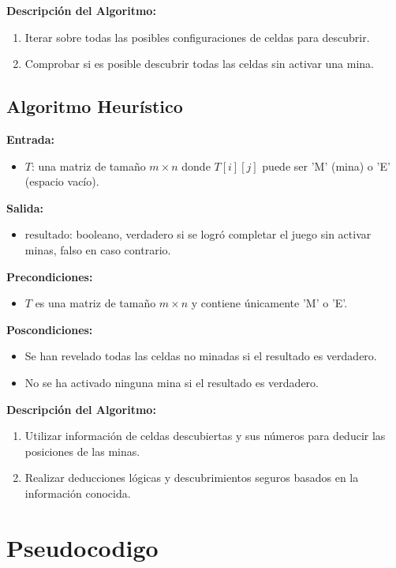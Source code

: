 \documentclass{article}
\begin{document}
\textbf{Descripción del Algoritmo:}
\begin{enumerate}
    \item Iterar sobre todas las posibles configuraciones de celdas para descubrir.
    \item Comprobar si es posible descubrir todas las celdas sin activar una mina.
\end{enumerate}

\subsection*{Algoritmo Heurístico}

\textbf{Entrada:}
\begin{itemize}
    \item \( T \): una matriz de tamaño \( m \times n \) donde \( T[i][j] \) puede ser 'M' (mina) o 'E' (espacio vacío).
\end{itemize}

\textbf{Salida:}
\begin{itemize}
    \item \( \text{resultado} \): booleano, verdadero si se logró completar el juego sin activar minas, falso en caso contrario.
\end{itemize}

\textbf{Precondiciones:}
\begin{itemize}
    \item \( T \) es una matriz de tamaño \( m \times n \) y contiene únicamente 'M' o 'E'.
\end{itemize}

\textbf{Poscondiciones:}
\begin{itemize}
    \item Se han revelado todas las celdas no minadas si el resultado es verdadero.
    \item No se ha activado ninguna mina si el resultado es verdadero.
\end{itemize}

\textbf{Descripción del Algoritmo:}
\begin{enumerate}
    \item Utilizar información de celdas descubiertas y sus números para deducir las posiciones de las minas.
    \item Realizar deducciones lógicas y descubrimientos seguros basados en la información conocida.
\end{enumerate}

\section{Pseudocodigo}
\end{document}
